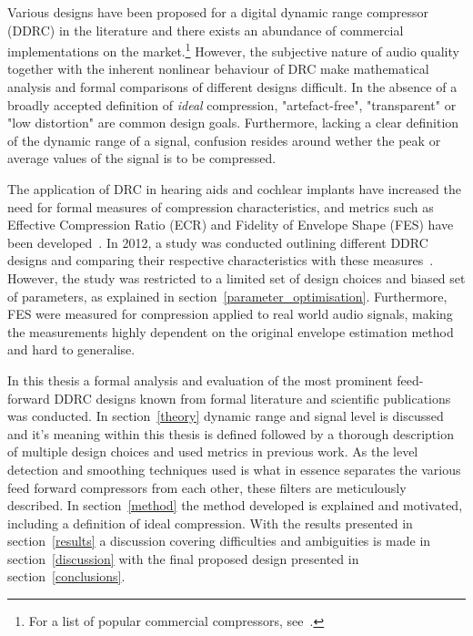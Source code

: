 \documentclass[../main2.tex]{subfiles}
\begin{document}
Various designs have been proposed for a digital dynamic range compressor (DDRC) in the literature and there exists an abundance of commercial implementations on the market.\footnote{For a list of popular commercial compressors, see~\cite{commercial}.} However, the subjective nature of audio quality together with the inherent nonlinear behaviour of DRC make mathematical analysis and formal comparisons of different designs difficult. In the absence of a broadly accepted definition of \emph{ideal} compression, "artefact-free", "transparent" or "low distortion" are common design goals. Furthermore, lacking a clear definition of the dynamic range of a signal, confusion resides around wether the peak or average values of the signal is to be compressed. 

The application of DRC in hearing aids and cochlear implants have increased the need for formal measures of compression characteristics, and metrics such as Effective Compression Ratio (ECR) and Fidelity of Envelope Shape (FES) have been developed~\cite{stone1992syllabic}\cite{stone2007quantifying}. In 2012, a study was conducted outlining different DDRC designs and comparing their respective characteristics with these measures~\cite{reiss2012tutorial}. However, the study was restricted to a limited set of design choices and biased set of parameters, as explained in section~\ref{parameter_optimisation}. Furthermore, FES were measured for compression applied to real world audio signals, making the measurements highly dependent on the original envelope estimation method and hard to generalise.

In this thesis a formal analysis and evaluation of the most prominent feed-forward DDRC designs known from formal literature and scientific publications was conducted. In section~\ref{theory} dynamic range and signal level is discussed and it's meaning within this thesis is defined followed by a thorough description of multiple design choices and used metrics in previous work. As the level detection and smoothing techniques used is what in essence separates the various feed forward compressors from each other, these filters are meticulously described. In section~\ref{method} the method developed is explained and motivated, including a definition of ideal compression. With the results presented in section~\ref{results} a discussion covering difficulties and ambiguities is made in section~\ref{discussion} with the final proposed design presented in section~\ref{conclusions}.
\end{document}
